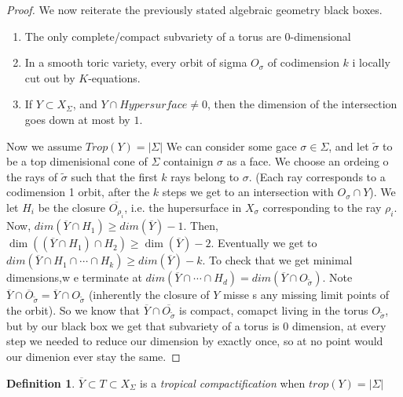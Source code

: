 \documentclass[11pt]{article}
\theoremstyle{definition}
\newtheorem{protodefinition}{Definition}[section]
\newenvironment{define}
   {\begin{protodefinition}}
   {\end{protodefinition}}
\begin{document}
\begin{proof}
    



 


    We now reiterate the previously stated algebraic geometry black boxes.
    \begin{enumerate}
        \item The only complete/compact subvariety of a torus are 0-dimensional
        \item In a smooth toric variety, every orbit of sigma $O_\sigma$ of codimension $k$ i locally cut out by $K$-equations.
        \item If $Y \subset X_\Sigma$, and $Y \cap Hypersurface \neq 0$, then the dimension of the intersection goes down at most by $1$.
    \end{enumerate}

Now we assume $Trop(Y)=|\Sigma|$   We can consider some gace $\sigma\in \Sigma$, and let $\tilde{\sigma}$ to be a top dimenisional cone of $\Sigma$ containign $\sigma$ as a face. We choose an ordeing o the rays of $\tilde{\sigma}$ such that the first $k$ rays belong to $\sigma$. (Each ray corresponds to a codimension 1 orbit, after the $k$ steps we get to an intersection with $O_\sigma \cap Y$). We let $H_i$ be the closure $\overline{O_{\rho_i}}$, i.e. the hupersurface in $X _\sigma$ corresponding to the ray $\rho_i$. Now, $dim(\overline{Y} \cap H_1) \geq dim(\overline{Y}) -1$. Then, $\dim ((\overline{Y} \cap H_1)\cap H_2) \geq \dim(\overline{Y})-2$. Eventually we get to $dim(\overline{Y} \cap H_1 \cap \cdots \cap H_k) \geq dim(\overline{Y})-k$. To check that we get minimal dimensions,w e terminate at $dim(\overline{Y} \cap \cdots \cap H_d) = dim(\overline{Y} \cap O_{\tilde{\sigma}})$. Note $\overline{Y} \cap \overline{O}_{\tilde{\sigma}} = \overline{Y} \cap O_{\tilde{\sigma}}$ (inherently the closure of $Y$ misse s any missing limit points of the orbit). So we know that $\overline{Y} \cap \overline{O_{\tilde{\sigma}}}$ is compact, comapct living in the torus $O_{\tilde{\sigma}}$, but by our black box we get that subvariety of a torus is 0 dimension, at every step we needed to reduce our dimension by exactly once, so at no point would our dimenion ever stay the same.




\end{proof}

\begin{define}
$\overline{Y} \subset T \subset X_\Sigma$ is a \emph{tropical compactification} when $trop(Y) = |\Sigma|$
\end{define}
\end{document}
